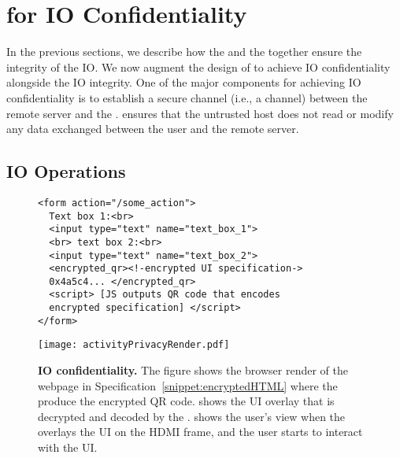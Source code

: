\section{\name for IO Confidentiality}
\label{sec:confidentiality}


In the previous sections, we describe how the \name \js and the \device together ensure the integrity of the IO. We now augment the design of \name to achieve IO confidentiality alongside the IO integrity. One of the major components for achieving IO confidentiality is to establish a secure channel (i.e., a \tls channel) between the remote server and the \device. \tls ensures that the untrusted host does not read or modify any data exchanged between the user and the remote server.  


\subsection{IO Operations}
\label{sec:confidentiality:io}

\begin{figure}[t]
\small
\begin{lstlisting}[mathescape=true]
<form action="/some_action">
  Text box 1:<br>
  <input type="text" name="text_box_1">
  <br> text box 2:<br>
  <input type="text" name="text_box_2">
  <encrypted_qr><!-encrypted UI specification->
  0x4a5c4... </encrypted_qr>
  <script> [JS outputs QR code that encodes 
  encrypted specification] </script>
</form> 
\end{lstlisting} 
\end{figure}



\begin{figure}[t]
\centering
\texttt{[image: activityPrivacyRender.pdf]}
\caption{\textbf{\name IO confidentiality.} The figure shows \one the browser render of the webpage in Specification~\ref{snippet:encryptedHTML} where the \name \js produce the encrypted QR code. \two shows the UI overlay that is decrypted and decoded by the \device. \three shows the user's view when the \device overlays the UI on the HDMI frame, and the user starts to interact with the UI.}
\spacesave
\label{fig:activityPrivacy}
\centering
\end{figure}

